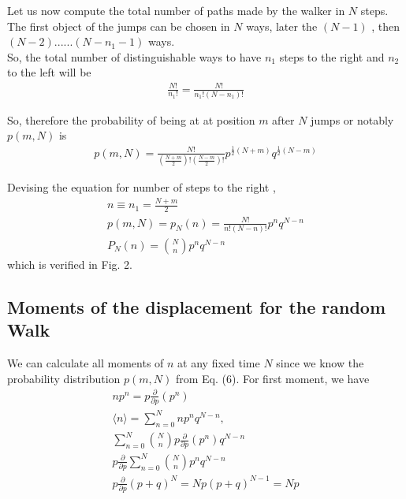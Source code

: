 \documentclass[showpacs,amsmath,amssymb,aps,pre,twocolumn]{revtex4-1}
\begin{document}

Let us now compute the total number of paths
made by the walker in $N$ steps. The first object of the jumps can be chosen in $N$ ways, later the $(N-1)$ , then $(N-2)......(N-n_1 - 1)$ ways.\\So, the total number of distinguishable ways to have $n_1$ steps to the right and $n_2$ to the left will be 
\begin{align}
    \frac{N!}{n_1 !}  =  \frac{N!}{n_1 ! (N-n_1)!}
\end{align}

So, therefore the probability of being at at position $m$ after $N$ jumps or notably $p(m,N)$ is
\begin{align}
    p(m,N) = \frac{N!}{(\frac{N+m}{2})! (\frac{N-m}{2})!} p^{\frac{1}{2}(N+m)} q^{\frac{1}{2}(N-m)}
\end{align}

Devising the equation for number of steps to the right , 
\begin{align}
n \equiv n_1 = \frac{N+m}{2}\\
p(m,N) = p_N(n) = \frac{N!}{n!(N-n)!}p^n q^{N-n}\\
P_N(n) = \binom{N}{n} p^n q^{N-n}
\end{align}
which is verified in Fig. 2.


\subsection{Moments of the displacement for the random Walk}
We can calculate all moments of $n$ at any fixed time $N$ since we know the probability distribution $p(m,N)$ from Eq. (6). For first moment, we have 
\begin{gather}
    n p^n = p \frac{\partial}{\partial p}(p^n)\\
\langle n \rangle=    \sum_{n=0}^{N} n p^n q^{N-n},\\
    \sum_{n=0}^{N} \binom{N}{n} p \frac{\partial}{\partial p} (p^n) q^{N-n}\\
    p \frac{\partial}{\partial p} \sum_{n=0}^{N} \binom{N}{n} p^n q^{N-n}\\
    p \frac{\partial}{\partial p} (p+q)^N = Np(p+q)^{N-1} = Np
\end{gather}
\end{document}
